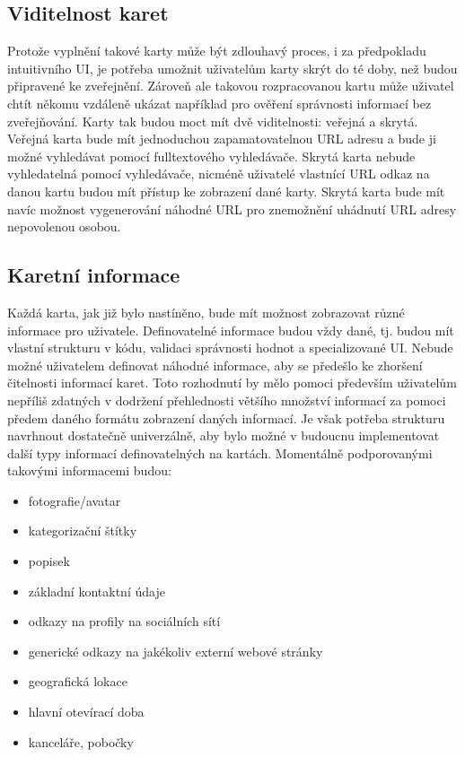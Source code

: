 	\subsection{Viditelnost karet}

	Protože vyplnění takové karty může být zdlouhavý proces, i za předpokladu intuitivního \ac{UI}, je potřeba umožnit
	uživatelům karty skrýt do té doby, než budou připravené ke zveřejnění.
	Zároveň ale takovou rozpracovanou kartu může uživatel chtít někomu vzdáleně ukázat například pro ověření správnosti informací
	bez zveřejňování.
	Karty tak budou moct mít dvě viditelnosti: veřejná a skrytá.
	Veřejná karta bude mít jednoduchou zapamatovatelnou \ac{URL} adresu a bude ji možné vyhledávat pomocí fulltextového vyhledávače.
	Skrytá karta nebude vyhledatelná pomocí vyhledávače, nicméně uživatelé vlastnící \ac{URL} odkaz na danou kartu budou mít přístup
	ke zobrazení dané karty.
	Skrytá karta bude mít navíc možnost vygenerování náhodné \ac{URL} pro znemožnění uhádnutí \ac{URL} adresy nepovolenou osobou.

	\subsection{Karetní informace}

	Každá karta, jak již bylo nastíněno, bude mít možnost zobrazovat různé informace pro uživatele.
	Definovatelné informace budou vždy dané, tj. budou mít vlastní strukturu v kódu, validaci správnosti hodnot a specializované
	\ac{UI}.
	Nebude možné uživatelem definovat náhodné informace, aby se předešlo ke zhoršení čitelnosti informací karet.
	Toto rozhodnutí by mělo pomoci především uživatelům nepříliš zdatných v dodržení přehlednosti většího množství
	informací za pomoci předem daného formátu zobrazení daných informací.
	Je však potřeba strukturu navrhnout dostatečně univerzálně, aby bylo možné v budoucnu implementovat další typy informací
	definovatelných na kartách.
	Momentálně podporovanými takovými informacemi budou:
	\begin{itemize}
		\item fotografie/avatar
		\item kategorizační štítky
		\item popisek
		\item základní kontaktní údaje
		\item odkazy na profily na sociálních sítí
		\item generické odkazy na jakékoliv externí webové stránky
		\item geografická lokace
		\item hlavní otevírací doba
		\item kanceláře, pobočky
	\end{itemize}

